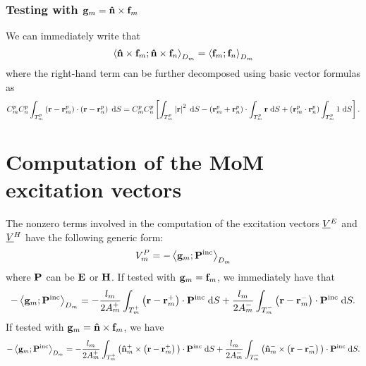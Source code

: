 \subsubsection{Testing with $\mathbf{g}_m = \mathbf{\Hat{n}} \times \mathbf{f}_m$}
%
\par
We can immediately write that
\begin{equation}
\left\langle \mathbf{\Hat{n}} \times \mathbf{f}_m ; \mathbf{\Hat{n}} \times \mathbf{f}_n \right\rangle_{D_m} = \left\langle \mathbf{f}_m ; \mathbf{f}_n \right\rangle_{D_m} 
\end{equation}
where the right-hand term can be further decomposed using basic vector formulas as
\begin{equation} \label{eqn:MMPIE_J_n_x_RWG_testing_diag_term}
C_m^p C_n^p \int_{T_m^p} \left(\mathbf{r}-\mathbf{r}_m^p \right) \cdot \left(\mathbf{r}-\mathbf{r}_n^p\right) \; \text{d} S = C_m^p C_n^p \left[ \int_{T_m^p} \left|\mathbf{r}\right|^2 \; \text{d} S - \left(\mathbf{r}_m^p + \mathbf{r}_n^p \right) \cdot \int_{T_m^p} \mathbf{r} \; \text{d} S + \left(\mathbf{r}_m^p \cdot \mathbf{r}_n^p \right) \int_{T_m^p} 1 \; \text{d} S\right].
\end{equation}


\section{Computation of the MoM excitation vectors}
\label{app:Computation of the MoM excitation vectors}
%
\par
The nonzero terms involved in the computation of the excitation vectors $\underline{V} \thinspace \negthinspace _{} ^{E}$ and $\underline{V} \thinspace \negthinspace _{} ^{H}$ have the following generic form:
\begin{equation}
V_m^{P} = -\left\langle \mathbf{g}_m ; \mathbf{P}^\text{inc} \right\rangle_{D_m}
\end{equation}
where $\mathbf{P}$ can be $\mathbf{E}$ or $\mathbf{H}$. If tested with $\mathbf{g}_m = \mathbf{f}_m$, we immediately have that
\begin{equation}
-\left\langle \mathbf{g}_m ; \mathbf{P}^\text{inc} \right\rangle_{D_m} = -\frac{l_m}{2 A_m^+}\int_{T_m^+} \left(\mathbf{r} - \mathbf{r}_m^+ \right) \cdot \mathbf{P}^\text{inc} \; \text{d} S + \frac{l_m}{2 A_m^-}\int_{T_m^-} \left(\mathbf{r} - \mathbf{r}_m^- \right) \cdot \mathbf{P}^\text{inc} \; \text{d} S.
\end{equation}
If tested with $\mathbf{g}_m = \mathbf{\Hat{n}} \times \mathbf{f}_m$, we have 
\begin{equation}
-\left\langle \mathbf{g}_m ; \mathbf{P}^\text{inc} \right\rangle_{D_m} = -\frac{l_m}{2 A_m^+}\int_{T_m^+} \big( \mathbf{\Hat{n}}_m^+ \times \left(\mathbf{r} - \mathbf{r}_m^+ \right) \big) \cdot \mathbf{P}^\text{inc} \; \text{d} S + \frac{l_m}{2 A_m^-}\int_{T_m^-} \big( \mathbf{\Hat{n}}_m^- \times \left(\mathbf{r} - \mathbf{r}_m^- \right)\big) \cdot \mathbf{P}^\text{inc} \; \text{d} S.
\end{equation}






